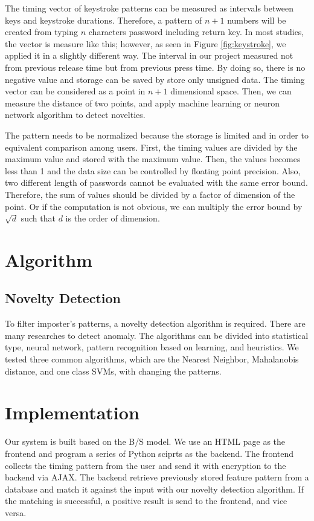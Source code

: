 \documentclass[twocolumn,showpacs,%
  nofootinbib,aps,%
  eqsecnum,prd,notitlepage,showkeys,10pt]{revtex4-1}
\begin{document}
The timing vector of keystroke patterns can be measured as intervals between keys and keystroke durations\cite{cho2000web}. Therefore, a pattern of $n+1$ numbers will be created from typing $n$ characters password including return key. In most studies, the vector is measure like this; however, as seen in Figure \ref{fig:keystroke}, we applied it in a slightly different way. The interval in our project measured not from previous release time but from previous press time. By doing so, there is no negative value and storage can be saved by store only unsigned data. The timing vector can be considered as a point in $n+1$ dimensional space. Then, we can measure the distance of two points, and apply machine learning or neuron network algorithm to detect novelties.
\par
The pattern needs to be normalized because the storage is limited and in order to equivalent comparison among users. First, the timing values are divided by the maximum value and stored with the maximum value. Then, the values becomes less than 1 and the data size can be controlled by floating point precision. Also, two different length of passwords cannot be evaluated with the same error bound. Therefore, the sum of values should be divided by a factor of dimension of the point. Or if the computation is not obvious, we can multiply the error bound by $\sqrt{d}$ such that $d$ is the order of dimension.

\section{Algorithm}
\subsection{Novelty Detection}
To filter imposter's patterns, a novelty detection algorithm is required. There are many researches to detect anomaly. The algorithms can be divided into statistical type, neural network, pattern recognition based on learning, and heuristics\cite{banerjee2012biometric}. We tested three common algorithms, which are the Nearest Neighbor, Mahalanobis distance, and one class SVMs, with changing the patterns.

\section{Implementation}
Our system is built based on the B/S model. We use an HTML page as the frontend and program a series of Python sciprts as the backend. The frontend collects the timing pattern from the user and send it with encryption to the backend via AJAX. The backend retrieve previously stored feature pattern from a database and match it against the input with our novelty detection algorithm. If the matching is successful, a positive result is send to the frontend, and vice versa.
\end{document}
